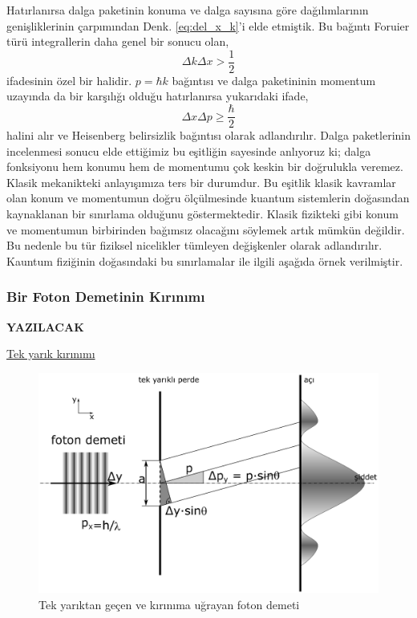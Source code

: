 \documentclass[a4paper,12pt, twoside]{article}
\newcommand{\YAZILACAK}{{\vspace{18pt}\bf\Large \color{red} YAZILACAK}}
\begin{document}
Hatırlanırsa dalga paketinin konuma ve dalga sayısına göre dağılımlarının genişliklerinin çarpımından Denk. \ref{eq:del_x_k}'i elde etmiştik. Bu bağıntı Foruier türü integrallerin daha genel bir sonucu olan,
\begin{equation}
\Delta k\Delta x >\dfrac {1}{2}
\end{equation}
ifadesinin özel bir halidir. $p = \hbar k$ bağıntısı ve dalga paketininin momentum uzayında da bir karşılığı olduğu hatırlanırsa yukarıdaki ifade,
\begin{equation}
\Delta x \Delta p \geq\dfrac {\hbar}{2}
\label{eq:heisenberg_uncertainty}
\end{equation}
halini alır ve Heisenberg belirsizlik bağıntısı olarak adlandırılır. Dalga paketlerinin incelenmesi sonucu elde ettiğimiz bu eşitliğin sayesinde anlıyoruz ki; dalga fonksiyonu hem konumu hem de momentumu çok keskin bir doğrulukla veremez. Klasik mekanikteki anlayışımıza ters bir durumdur. Bu eşitlik klasik kavramlar olan konum ve momentumun doğru ölçülmesinde kuantum sistemlerin doğasından kaynaklanan bir sınırlama olduğunu göstermektedir. Klasik fizikteki gibi konum ve momentumun birbirinden bağımsız olacağını söylemek artık mümkün değildir. Bu nedenle bu tür fiziksel nicelikler tümleyen değişkenler olarak adlandırılır.  Kauntum fiziğinin doğasındaki bu sınırlamalar ile ilgili aşağıda örnek verilmiştir.  

\subsubsection{Bir Foton Demetinin Kırınımı}
\YAZILACAK

\href{https://opentextbc.ca/physicstestbook2/chapter/single-slit-diffraction/}{Tek yarık kırınımı}

\begin{figure}[hbtp]
	\centering
	\includegraphics[width=0.5\linewidth]{figurler/tek_yarik_deneyi}
	\caption{Tek yarıktan geçen ve kırınıma uğrayan foton demeti}
	\label{fig:tekyarikdeneyi}
\end{figure}
\end{document}
